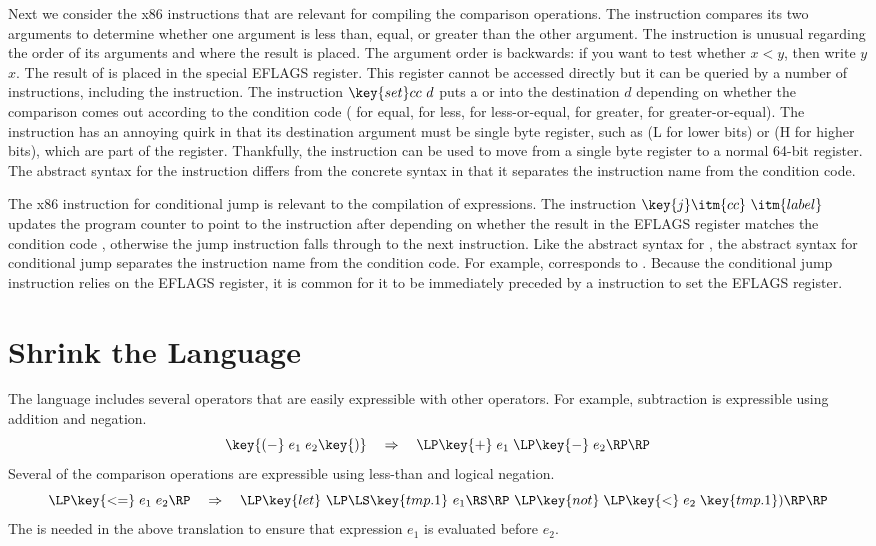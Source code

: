 \documentclass[11pt]{book}
\begin{document}
Next we consider the x86 instructions that are relevant for compiling
the comparison operations. The  instruction compares its two
arguments to determine whether one argument is less than, equal, or
greater than the other argument. The  instruction is unusual
regarding the order of its arguments and where the result is
placed. The argument order is backwards: if you want to test whether
$x < y$, then write  $y$\code{,} $x$. The result of
 is placed in the special EFLAGS register. This register
cannot be accessed directly but it can be queried by a number of
instructions, including the  instruction. The instruction
$\key{set}cc~d$ puts a  or  into the destination $d$
depending on whether the comparison comes out according to the
condition code  ( for equal,  for less, 
for less-or-equal,  for greater,  for
greater-or-equal).  The  instruction has an annoying quirk in
that its destination argument must be single byte register, such as
 (L for lower bits) or  (H for higher bits), which
are part of the  register.  Thankfully, the 
instruction can be used to move from a single byte register to a
normal 64-bit register.  The abstract syntax for the 
instruction differs from the concrete syntax in that it separates the
instruction name from the condition code.

The x86 instruction for conditional jump is relevant to the
compilation of  expressions.  The instruction
$\key{j}\itm{cc}~\itm{label}$ updates the program counter to point to
the instruction after  depending on whether the result in
the EFLAGS register matches the condition code , otherwise the
jump instruction falls through to the next instruction.  Like the
abstract syntax for , the abstract syntax for conditional
jump separates the instruction name from the condition code. For
example,  corresponds to .  Because
the conditional jump instruction relies on the EFLAGS register, it is
common for it to be immediately preceded by a  instruction
to set the EFLAGS register.


\section{Shrink the \LangIf{} Language}
\label{sec:shrink-Rif}

The \LangIf{} language includes several operators that are easily
expressible with other operators. For example, subtraction is
expressible using addition and negation.
\[
 \key{(-}\; e_1 \; e_2\key{)} \quad \Rightarrow \quad \LP\key{+} \; e_1 \; \LP\key{-} \; e_2\RP\RP
\]
Several of the comparison operations are expressible using less-than
and logical negation.
\[
\LP\key{<=}\; e_1 \; e_2\RP \quad \Rightarrow \quad
\LP\key{let}~\LP\LS\key{tmp.1}~e_1\RS\RP~\LP\key{not}\;\LP\key{<}\;e_2\;\key{tmp.1})\RP\RP
\]
The  is needed in the above translation to ensure that
expression $e_1$ is evaluated before $e_2$.
\end{document}
